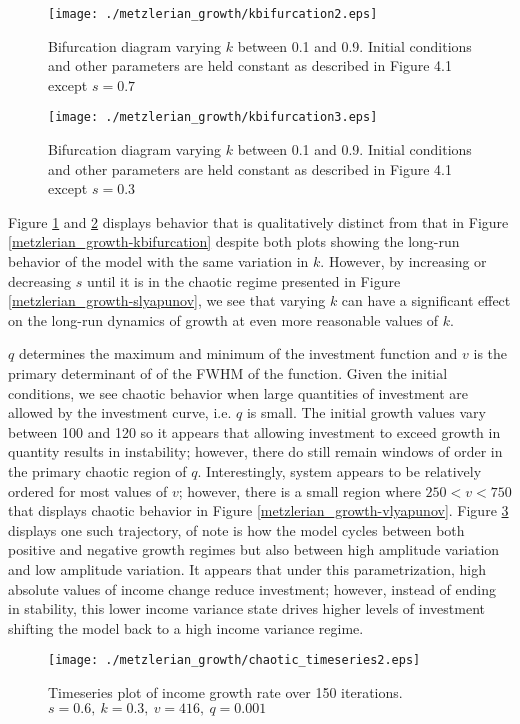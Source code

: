\begin{figure}
    \centering
    \texttt{[image: ./metzlerian\_growth/kbifurcation2.eps]}
    \caption{Bifurcation diagram varying $k$ between 0.1 and 0.9. Initial conditions and other parameters are held constant as described in Figure 4.1 except $s=0.7$}
    \label{metzlerian_growth-kbifurcation2}
\end{figure}
\begin{figure}
    \centering
    \texttt{[image: ./metzlerian\_growth/kbifurcation3.eps]}
    \caption{Bifurcation diagram varying $k$ between 0.1 and 0.9. Initial conditions and other parameters are held constant as described in Figure 4.1 except $s=0.3$}
    \label{metzlerian_growth-kbifurcation3}
\end{figure}
Figure \ref{metzlerian_growth-kbifurcation2} and \ref{metzlerian_growth-kbifurcation3} displays behavior that is qualitatively distinct from that in Figure \ref{metzlerian_growth-kbifurcation} despite both plots showing the long-run behavior of the model with the same variation in $k$. However, by increasing or decreasing $s$ until it is in the chaotic regime presented in Figure \ref{metzlerian_growth-slyapunov}, we see that varying $k$ can have a significant effect on the long-run dynamics of growth at even more reasonable values of $k$.

$q$ determines the maximum and minimum of the investment function and $v$ is the primary determinant of of the FWHM of the function. Given the initial conditions, we see chaotic behavior when large quantities of investment are allowed by the investment curve, i.e. $q$ is small. The initial growth values vary between 100 and 120 so it appears that allowing investment to exceed growth in quantity results in instability;  however, there do still remain windows of order in the primary chaotic region of $q$. Interestingly, system appears to be relatively ordered for most values of $v$; however, there is a small region where $250<v<750$ that displays chaotic behavior in Figure \ref{metzlerian_growth-vlyapunov}. Figure \ref{metzlerian_growth-chaotic_timeseries2} displays one such trajectory, of note is how the model cycles between both positive and negative growth regimes but also between high amplitude variation and low amplitude variation. It appears that under this parametrization, high absolute values of income change reduce investment; however, instead of ending in stability, this lower income variance state drives higher levels of investment shifting the model back to a high income variance regime.
\begin{figure}
    \centering
    \texttt{[image: ./metzlerian\_growth/chaotic\_timeseries2.eps]}
    \caption{Timeseries plot of income growth rate over 150 iterations. $s=0.6,\ k=0.3,\ v=416,\ q=0.001$}
    \label{metzlerian_growth-chaotic_timeseries2}
\end{figure}

